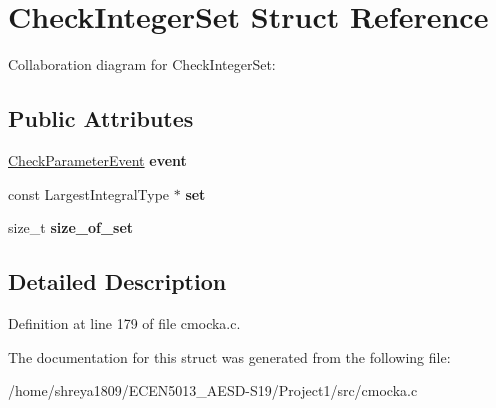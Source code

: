 \hypertarget{structCheckIntegerSet}{}\section{Check\+Integer\+Set Struct Reference}
\label{structCheckIntegerSet}


Collaboration diagram for Check\+Integer\+Set\+:
\subsection*{Public Attributes}
\begin{DoxyCompactItemize}
\item 
\mbox{\label{structCheckIntegerSet_a7153dfb1ec04c0fcacfeb2d60321d4fd}} 
\hyperlink{structCheckParameterEvent}{Check\+Parameter\+Event} {\bfseries event}
\item 
\mbox{\label{structCheckIntegerSet_a9bb5e12093c709bc42788033506c1c2a}} 
const Largest\+Integral\+Type $\ast$ {\bfseries set}
\item 
\mbox{\label{structCheckIntegerSet_a82dbcbeea43de48060c86d89c6ccc444}} 
size\+\_\+t {\bfseries size\+\_\+of\+\_\+set}
\end{DoxyCompactItemize}


\subsection{Detailed Description}


Definition at line 179 of file cmocka.\+c.



The documentation for this struct was generated from the following file\+:\begin{DoxyCompactItemize}
\item 
/home/shreya1809/\+E\+C\+E\+N5013\+\_\+\+A\+E\+S\+D-\/\+S19/\+Project1/src/cmocka.\+c\end{DoxyCompactItemize}
